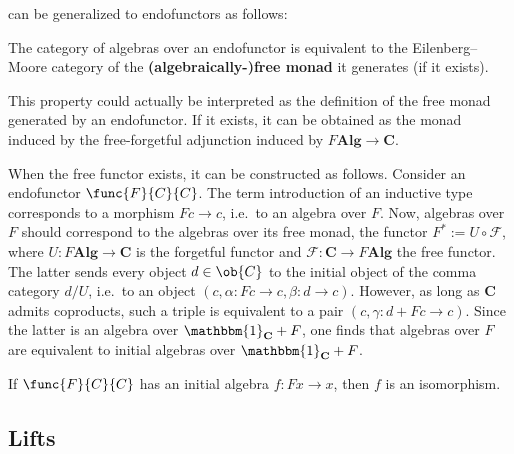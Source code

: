      can be generalized to endofunctors as follows:
    \begin{property}\label{cat:algebraically_free_monad}
        The category of algebras over an endofunctor is equivalent to the Eilenberg--Moore category of the \textbf{(algebraically-)free monad} it generates (if it exists).
    \end{property}
    \begin{construct}
        This property could actually be interpreted as the definition of the free monad generated by an endofunctor. If it exists, it can be obtained as the monad induced by the free-forgetful adjunction induced by $F\mathbf{Alg}\rightarrow\mathbf{C}$.

        When the free functor exists, it can be constructed as follows. Consider an endofunctor $\func{F}{C}{C}$. The term introduction of an inductive type corresponds to a morphism $Fc\rightarrow c$, i.e.~to an algebra over $F$. Now, algebras over $F$ should correspond to the algebras over its free monad, the functor $F^*:=U\circ\mathcal{F}$, where $U:F\mathbf{Alg}\rightarrow\mathbf{C}$ is the forgetful functor and $\mathcal{F}:\mathbf{C}\rightarrow F\mathbf{Alg}$ the free functor. The latter sends every object $d\in\ob{C}$ to the initial object of the comma category $d/U$, i.e.~to an object $(c,\alpha: Fc\rightarrow c,\beta:d\rightarrow c)$. However, as long as $\mathbf{C}$ admits coproducts, such a triple is equivalent to a pair $(c,\gamma:d+Fc\rightarrow c)$. Since the latter is an algebra over $\mathbbm{1}_\mathbf{C}+F$, one finds that algebras over $F$ are equivalent to initial algebras over $\mathbbm{1}_\mathbf{C}+F$.
    \end{construct}

    \begin{theorem}[Lambek]
        If $\func{F}{C}{C}$ has an initial algebra $f:Fx\rightarrow x$, then $f$ is an isomorphism.
    \end{theorem}

\subsection{Lifts}

